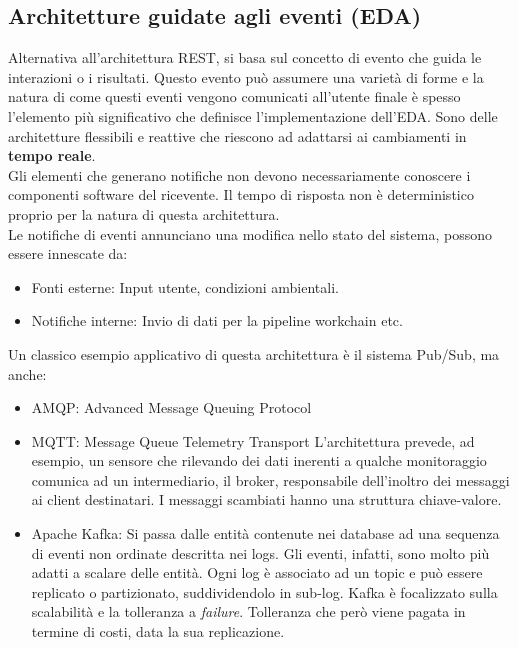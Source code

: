 \documentclass{article}
\begin{document}
		\subsection{Architetture guidate agli eventi (EDA)}
		Alternativa all'architettura REST, si basa sul concetto di evento che guida le interazioni o i risultati. Questo evento può assumere una varietà di forme e la natura di come questi eventi vengono comunicati all'utente finale è spesso l'elemento più significativo che definisce l'implementazione dell'EDA. Sono delle architetture flessibili e reattive che riescono ad adattarsi ai cambiamenti in \textbf{tempo reale}.\\
		
		Gli elementi che generano notifiche non devono necessariamente conoscere i componenti software del ricevente. Il tempo di risposta non è deterministico proprio per la natura di questa architettura.\\
		
		Le notifiche di eventi annunciano una modifica nello stato del sistema, possono essere innescate da:
		\begin{itemize}
		    \item Fonti esterne: Input utente, condizioni ambientali.
		    \item Notifiche interne: Invio di dati per la pipeline workchain etc.
		\end{itemize}
		Un classico esempio applicativo di questa architettura è il sistema Pub/Sub, ma anche:
		\begin{itemize}
		    \item AMQP: Advanced Message Queuing Protocol
		    \item MQTT: Message Queue Telemetry Transport
		    L'architettura prevede, ad esempio, un sensore che rilevando dei dati inerenti a qualche monitoraggio comunica ad un intermediario, il broker, responsabile dell'inoltro dei messaggi ai client destinatari. I messaggi scambiati hanno una struttura chiave-valore.
		    \item Apache Kafka: Si passa dalle entità contenute nei database ad una sequenza di eventi non ordinate descritta nei logs.
		    Gli eventi, infatti, sono molto più adatti a scalare delle entità. Ogni log è associato ad un topic e può essere replicato o partizionato, suddividendolo in sub-log.
		    Kafka è focalizzato sulla scalabilità e la tolleranza a \textit{failure}. Tolleranza che però viene pagata in termine di costi, data la sua replicazione.
		\end{itemize}
		
\end{document}

